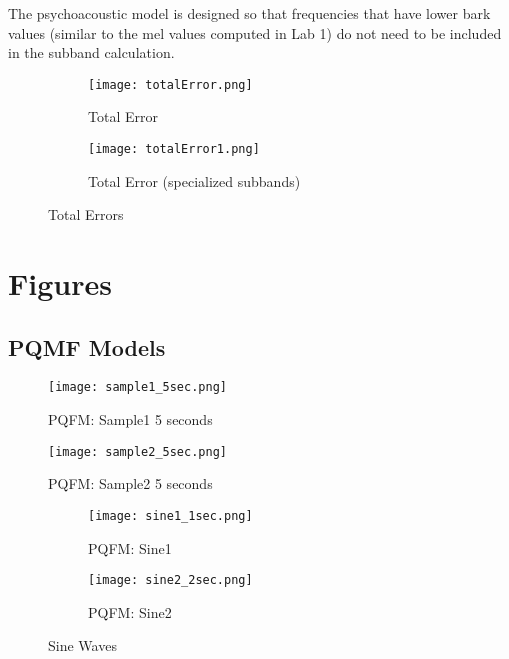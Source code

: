 \documentclass{article} %
\begin{document}
The psychoacoustic model is designed so that frequencies that have lower bark values (similar to the mel values
computed in Lab 1) do not need to be included in the subband calculation. 


\begin{figure}[H]

\begin{subfigure}{0.5\textwidth}
\centering
\texttt{[image: totalError.png]}
\caption{Total Error}
\label{fig:totErr0}
\end{subfigure}
\begin{subfigure}{0.5\textwidth}
\centering
\texttt{[image: totalError1.png]}
\caption{Total Error (specialized subbands)}
\label{fig:totErr1}
\end{subfigure}
\caption{Total Errors}
\label{fig:totErr}
\end{figure}


\clearpage
\appendix
\section{Figures}

\subsection{PQMF Models}
\begin{figure}[H]
\centering
\texttt{[image: sample1\_5sec.png]}
\caption{PQFM: Sample1 5 seconds}
\end{figure}

\begin{figure}[H]
\centering
\texttt{[image: sample2\_5sec.png]}
\caption{PQFM: Sample2 5 seconds}
\end{figure}


\begin{figure}[H]

\begin{subfigure}{0.5\textwidth}
\centering
\texttt{[image: sine1\_1sec.png]}
\caption{PQFM: Sine1}
\end{subfigure}
\begin{subfigure}{0.5\textwidth}
\centering
\texttt{[image: sine2\_2sec.png]}
\caption{PQFM: Sine2}
\end{subfigure}
\caption{Sine Waves}
\end{figure}
\end{document}
